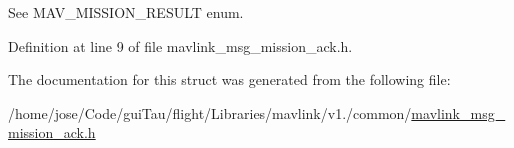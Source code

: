 See M\-A\-V\-\_\-\-M\-I\-S\-S\-I\-O\-N\-\_\-\-R\-E\-S\-U\-L\-T enum. 



Definition at line 9 of file mavlink\-\_\-msg\-\_\-mission\-\_\-ack.\-h.



The documentation for this struct was generated from the following file\-:\begin{DoxyCompactItemize}
\item 
/home/jose/\-Code/gui\-Tau/flight/\-Libraries/mavlink/v1./common/\hyperlink{mavlink__msg__mission__ack_8h}{mavlink\-\_\-msg\-\_\-mission\-\_\-ack.\-h}\end{DoxyCompactItemize}
